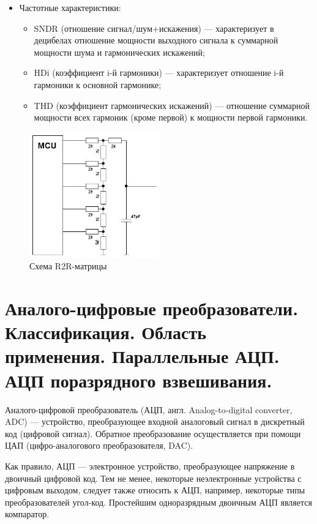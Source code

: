 \documentclass[unicode, 12pt, a4paper, oneside]{article}
\begin{document}
\begin{itemize}
\item Частотные характеристики:
	\begin{itemize}
	\item SNDR (отношение сигнал/шум+искажения) — характеризует в децибелах отношение мощности выходного сигнала к суммарной мощности шума и гармонических искажений;
	\item HDi (коэффициент i-й гармоники) — характеризует отношение i-й гармоники к основной гармонике;
	\item THD (коэффициент гармонических искажений) — отношение суммарной мощности всех гармоник (кроме первой) к мощности первой гармоники.
	\end{itemize}
\end{itemize}

\begin{figure}[H]
\centering
\includegraphics[width=0.5\textwidth]{15_R2R.png}
\caption{Схема R2R-матрицы}
\label{fig:15_R2R}
\end{figure}


\section{Аналого-цифровые преобразователи. Классификация. Область применения. Параллельные АЦП. АЦП поразрядного взвешивания.}

Аналого-цифровой преобразователь (АЦП, англ. Analog-to-digital converter, ADC) — устройство, преобразующее входной аналоговый сигнал в дискретный код (цифровой сигнал). Обратное преобразование осуществляется при помощи ЦАП (цифро-аналогового преобразователя, DAC).

Как правило, АЦП — электронное устройство, преобразующее напряжение в двоичный цифровой код. Тем не менее, некоторые неэлектронные устройства с цифровым выходом, следует также относить к АЦП, например, некоторые типы преобразователей угол-код. Простейшим одноразрядным двоичным АЦП является компаратор.
\end{document}
